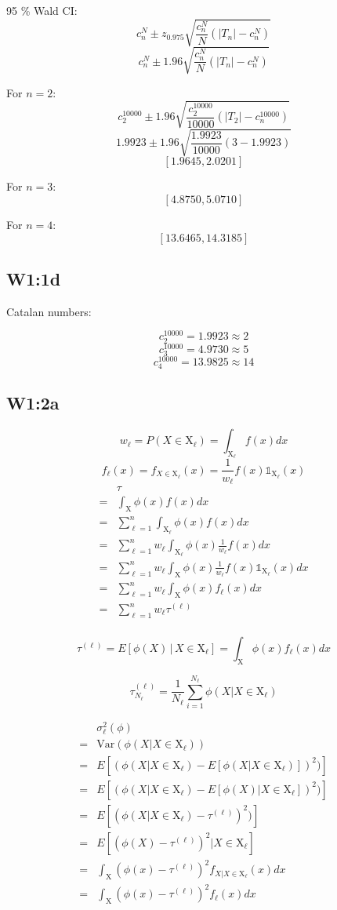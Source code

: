 \documentclass{article}
\begin{document}
95 \% Wald CI:
\[c_n^N \pm z_{0.975}\sqrt{\frac{c_n^N}{N}(|T_n|-c_n^N)}\]
\[c_n^N \pm 1.96\sqrt{\frac{c_n^N}{N}(|T_n|-c_n^N)}\]

For \(n=2\):
\[c_2^{10000} \pm 1.96\sqrt{\frac{c_2^{10000}}{10000}(|T_2|-c_n^{10000})}\]
\[1.9923 \pm 1.96\sqrt{\frac{1.9923}{10000}(3-1.9923)}\]
\[[1.9645,2.0201]\]

For \(n=3\):
\[[4.8750,5.0710]\]

For \(n=4\):
\[[13.6465,14.3185]\]

\subsection{W1:1d}

Catalan numbers:

\[c_2^{10000} = 1.9923 \approx 2\]
\[c_3^{10000} = 4.9730 \approx 5\]
\[c_4^{10000} = 13.9825 \approx 14\]

\subsection{W1:2a}

\[w_\ell = P(X\in\text{X}_\ell) = \int_{\text{X}_\ell} f(x)dx\]
\[f_\ell(x) = f_{X\in\text{X}_\ell}(x) = \frac{1}{w_\ell} f(x)\mathds{1}_{\text{X}_\ell}(x)\]
\begin{align*}
   & \tau \\
   =& \int_{\text{X}} \phi(x)f(x)dx \\
   =& \sum_{\ell=1}^n\int_{\text{X}_\ell} \phi(x)f(x)dx \\
   =& \sum_{\ell=1}^n w_\ell\int_{\text{X}_\ell} \phi(x)\frac{1}{w_\ell}f(x)dx \\
   =& \sum_{\ell=1}^n w_\ell\int_{\text{X}} \phi(x)\frac{1}{w_\ell}f(x)\mathds{1}_{\text{X}_\ell}(x)dx \\
   =& \sum_{\ell=1}^n w_\ell\int_{\text{X}} \phi(x)f_\ell(x)dx \\
   =& \sum_{\ell=1}^n w_\ell \tau^{(\ell)} \\
\end{align*}

\[\tau^{(\ell)} = E[\phi(X)\,|\,X\in\text{X}_\ell] = \int_{\text{X}}\phi(x)f_\ell(x)dx\]

\[\tau_{N_\ell}^{(\ell)} = \frac{1}{N_\ell} \sum_{i=1}^{N_\ell} \phi(X|X\in \text{X}_\ell)\]

\begin{align*}
   & \sigma_\ell^2(\phi) \\
   =& \text{Var}(\phi(X|X\in\text{X}_\ell)) \\
   =& E[(\phi(X|X\in\text{X}_\ell)-E[\phi(X|X\in\text{X}_\ell)])^2)] \\
   =& E[(\phi(X|X\in\text{X}_\ell)-E[\phi(X)|X\in\text{X}_\ell])^2)] \\
   =& E[(\phi(X|X\in\text{X}_\ell)-\tau^{(\ell)})^2)] \\
   =& E[(\phi(X)-\tau^{(\ell)})^2|X\in\text{X}_\ell] \\
   =& \int_\text{X}(\phi(x)-\tau^{(\ell)})^2 f_{X|X\in\text{X}_\ell}(x) dx \\
   =& \int_\text{X}(\phi(x)-\tau^{(\ell)})^2 f_\ell(x) dx \\
\end{align*}
\end{document}
